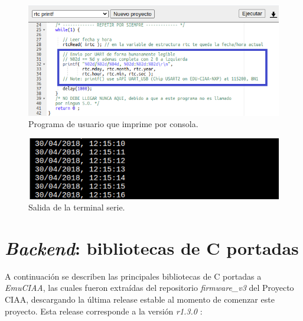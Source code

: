 \begin{figure}[ht]
	\centering
	\includegraphics[scale=.70]{./Figures/Terminal1.png}
	\caption{Programa de usuario que imprime por consola.}
	\label{fig:Terminal1}
\end{figure}

\begin{figure}[ht]
	\centering
	\includegraphics[scale=.70]{./Figures/Terminal2.png}
	\caption{Salida de la terminal serie.}
	\label{fig:Terminal2}
\end{figure}


\section{\textit{Backend}: bibliotecas de C portadas}
\label{sec:BibC}

A continuación se describen las principales bibliotecas de C portadas a \textit{EmuCIAA}, las cuales fueron extraídas del repositorio \textit{firmware\_v3} del Proyecto CIAA, descargando la última release estable al momento de comenzar este proyecto. Esta release corresponde a la versión \textit{r1.3.0} \citep{firmwareV3r130}:


